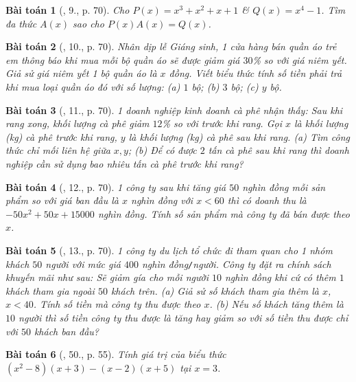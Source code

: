 \documentclass{article}
\newtheorem{baitoan}{Bài toán}
\begin{document}
\begin{baitoan}[\cite{SGK_Toan_7_Canh_Dieu_tap_2}, 9., p. 70]
	Cho $P(x) = x^3 + x^2 + x +1$ \& $Q(x) = x^4 - 1$. Tìm đa thức $A(x)$ sao cho $P(x)A(x) = Q(x)$. 
\end{baitoan}

\begin{baitoan}[\cite{SGK_Toan_7_Canh_Dieu_tap_2}, 10., p. 70]
	Nhân dịp lễ Giáng sinh, 1 cửa hàng bán quần áo trẻ em thông báo khi mua mỗi bộ quần áo sẽ được giảm giá $30$\% so với giá niêm yết. Giả sử giá niêm yết 1 bộ quần áo là $x$ đồng. Viết biểu thức tính số tiền phải trả khi mua loại quần áo đó với số lượng: (a) $1$ bộ; (b) $3$ bộ; (c) $y$ bộ.
\end{baitoan}

\begin{baitoan}[\cite{SGK_Toan_7_Canh_Dieu_tap_2}, 11., p. 70]
	1 doanh nghiệp kinh doanh cà phê nhận thấy: Sau khi rang xong, khối lượng cà phê giảm $12$\%  so với trước khi rang. Gọi $x$ là khối lượng (kg) cà phê trước khi rang, $y$ là khối lượng (kg) cà phê sau khi rang. (a) Tìm công thức chỉ mối liên hệ giữa $x,y$; (b) Để có được $2$ tấn cà phê sau khi rang thì doanh nghiệp cần sử dụng bao nhiêu tấn cà phê trước khi rang?
\end{baitoan}

\begin{baitoan}[\cite{SGK_Toan_7_Canh_Dieu_tap_2}, 12., p. 70]
	1 công ty sau khi tăng giá $50$ nghìn đồng mỗi sản phẩm so với giá ban đầu là $x$ nghìn đồng với $x < 60$ thì có doanh thu là $-50x^2 + 50x + 15000$ nghìn đồng. Tính số sản phẩm mà công ty đã bán được theo $x$.
\end{baitoan}

\begin{baitoan}[\cite{SGK_Toan_7_Canh_Dieu_tap_2}, 13., p. 70]
	1 công ty du lịch tổ chức đi tham quan cho 1 nhóm khách $50$ người với mức giá $400$ nghìn đồng\emph{\texttt{/}}người. Công ty đặt ra chính sách khuyến mãi như sau: Sẽ giảm gía cho mỗi người $10$ nghìn đồng khi cứ có thêm $1$ khách tham gia ngoài $50$ khách trên. (a) Giả sử số khách tham gia thêm là $x$, $x < 40$. Tính số tiền mà công ty thu được theo $x$. (b) Nếu số khách tăng thêm là $10$ người thì số tiền công ty thu được là tăng hay giảm so với số tiền thu được chỉ với $50$ khách ban đầu?
\end{baitoan}

\begin{baitoan}[\cite{SBT_Toan_7_Canh_Dieu_tap_2}, 50., p. 55]
	Tính giá trị của biểu thức $(x^2 - 8)(x + 3) - (x - 2)(x + 5)$ tại $x = 3$.
\end{baitoan}
\end{document}
